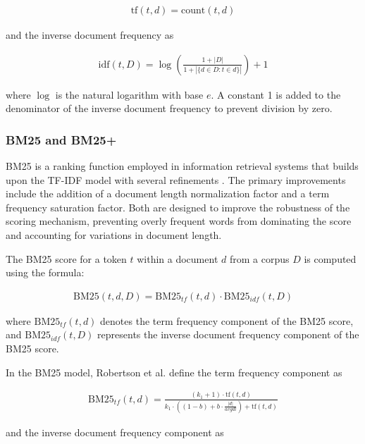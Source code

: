 \begin{align}
    \text{tf}(t, d) = \text{count}(t, d) \label{eq:tf-sklearn}
\end{align}

and the inverse document frequency as

\begin{align}
    \text{idf}(t, D) = \log \left( \frac{1 + |D|}{1 + |\{d \in D : t \in d\}|} \right) + 1 \label{eq:idf-sklearn}
\end{align}

where $\log$ is the natural logarithm with base $e$. A constant 1 is added to the denominator of the inverse document frequency to prevent division by zero.


\subsubsection*{BM25 and BM25+}

BM25 is a ranking function employed in information retrieval systems that builds upon the TF-IDF model with several refinements \cite{RobertsonOkapiTREC31995}. The primary improvements include the addition of a document length normalization factor and a term frequency saturation factor. Both are designed to improve the robustness of the scoring mechanism, preventing overly frequent words from dominating the score and accounting for variations in document length.

The BM25 score for a token $t$ within a document $d$ from a corpus $D$ is computed using the formula:

\begin{align}
    \text{BM25}(t, d, D) = \text{BM25}_{tf}(t, d) \cdot \text{BM25}_{idf}(t, D) \label{eq:bm25}
\end{align}

where $\text{BM25}_{tf}(t, d)$ denotes the term frequency component of the BM25 score, and $\text{BM25}_{idf}(t, D)$ represents the inverse document frequency component of the BM25 score.

In the BM25 model, Robertson et al. \cite{RobertsonOkapiTREC31995} define the term frequency component as

\begin{align}
    \text{BM25}_{tf}(t, d) = \frac{(k_1 + 1) \cdot \text{tf}(t, d)}{k_1 \cdot ((1 - b) + b \cdot \frac{|d|}{avgdl}) + \text{tf}(t, d)} \label{eq:bm25-tf}
\end{align}

and the inverse document frequency component as

